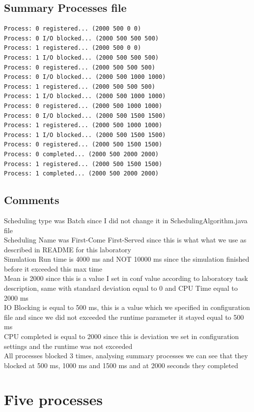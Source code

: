 \documentclass{article}
\begin{document}
\subsection{Summary Processes file}
\begin{lstlisting}
Process: 0 registered... (2000 500 0 0)
Process: 0 I/O blocked... (2000 500 500 500)
Process: 1 registered... (2000 500 0 0)
Process: 1 I/O blocked... (2000 500 500 500)
Process: 0 registered... (2000 500 500 500)
Process: 0 I/O blocked... (2000 500 1000 1000)
Process: 1 registered... (2000 500 500 500)
Process: 1 I/O blocked... (2000 500 1000 1000)
Process: 0 registered... (2000 500 1000 1000)
Process: 0 I/O blocked... (2000 500 1500 1500)
Process: 1 registered... (2000 500 1000 1000)
Process: 1 I/O blocked... (2000 500 1500 1500)
Process: 0 registered... (2000 500 1500 1500)
Process: 0 completed... (2000 500 2000 2000)
Process: 1 registered... (2000 500 1500 1500)
Process: 1 completed... (2000 500 2000 2000)
\end{lstlisting}
\subsection{Comments}
Scheduling type was Batch since I did not change it in SchedulingAlgorithm.java
file \\
Scheduling Name was First-Come First-Served since this is what what we use as
described in README for this laboratory \\
Simulation Run time is 4000 ms and NOT 10000 ms since the simulation finished
before it exceeded this max time \\
Mean is 2000 since this is a value I set in conf value according to laboratory
task description, same with standard deviation equal to 0 and CPU Time equal to
2000 ms \\
IO Blocking is equal to 500 ms, this is a value which we specified in
configuration file and since we did not exceeded the runtime parameter it stayed
equal to 500 ms \\
CPU completed is equal to 2000 since this is deviation we set in configuration
settings and the runtime was not exceeded \\
All processes blocked 3 times, analysing summary processes we can see that they
blocked at 500 ms, 1000 ms and 1500 ms and at 2000 seconds they completed 
 
\section{Five processes}
\newpage
\end{document}
